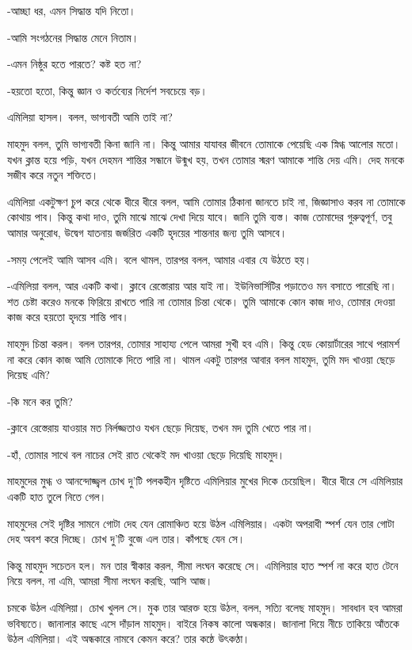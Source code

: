 \documentclass[
]{book}
\begin{document}
-আচ্ছা ধর, এমন সিদ্ধান্ত যদি নিতো।

-আমি সংগঠনের সিদ্ধান্ত মেনে নিতাম।

-এমন নিষ্ঠুর হতে পারতে? কষ্ট হত না?

-হয়তো হতো, কিন্তু জ্ঞান ও কর্তব্যের নির্দেশ সবচেয়ে বড়।

এমিলিয়া হাসল। বলল, ভাগ্যবতী আমি তাই না?

মাহমুদ বলল, তুমি ভাগ্যবতী কিনা জানি না। কিন্তু আমার যাযাবর জীবনে তোমাকে পেয়েছি এক স্নিগ্ধ আলোর মতো। যখন ক্লান্ত হয়ে পড়ি, যখন দেহমন শান্তির সন্ধানে উন্মুখ হয়, তখন তোমার স্মরণ আমাকে শান্তি দেয় এমি। দেহ মনকে সজীব করে নতুন শক্তিতে।

এমিলিয়া একটুক্ষণ চুপ করে থেকে ধীরে ধীরে বলল, আমি তোমার ঠিকানা জানতে চাই না, জিজ্ঞাসাও করব না তোমাকে কোথায় পাব। কিন্তু কথা দাও, তুমি মাঝে মাঝে দেখা দিয়ে যাবে। জানি তুমি ব্যস্ত। কাজ তোমাদের গুরুত্বপূর্ণ, তবু আমার অনুরোধ, উদ্বেগ যাতনায় জর্জরিত একটি হৃদয়ের শান্তনার জন্য তুমি আসবে।

-সময় পেলেই আমি আসব এমি। বলে থামল, তারপর বলল, আমার এবার যে উঠতে হয়।

-এমিলিয়া বলল, আর একটি কথা। ক্লাবে রেস্তোরায় আর যাই না। ইউনিভার্সিটির পড়াতেও মন বসাতে পারেছি না। শত চেষ্টা করেও মনকে ফিরিয়ে রাখতে পারি না তোমার চিন্তা থেকে। তুমি আমাকে কোন কাজ দাও, তোমার দেওয়া কাজ করে হয়তো হৃদয়ে শান্তি পাব।

মাহমুদ চিন্তা করল। বলল তারপর, তোমার সাহায্য পেলে আমরা সুখী হব এমি। কিন্তু হেড কোয়ার্টারের সাথে পরামর্শ না করে কোন কাজ আমি তোমাকে দিতে পারি না। থামল একটু তারপর আবার বলল মাহমুদ, তুমি মদ খাওয়া ছেড়ে দিয়েছ এমি?

-কি মনে কর তুমি?

-ক্লাবে রেস্তেরায় যাওয়ার মত নির্লজ্জতাও যখন ছেড়ে দিয়েছ, তখন মদ তুমি খেতে পার না।

-হাঁ, তোমার সাথে বল নাচের সেই রাত থেকেই মদ খাওয়া ছেড়ে দিয়েছি মাহমুদ।

মাহমুদের মুগ্ধ ও আনন্দোজ্জ্বল চোখ দু'টি পলকহীন দৃষ্টিতে এমিলিয়ার মুখের দিকে চেয়েছিল। ধীরে ধীরে সে এমিলিয়ার একটি হাত তুলে নিতে গেল।

মাহমুদের সেই দৃষ্টির সামনে গোটা দেহ যেন রোমাঞ্চিত হয়ে উঠল এমিলিয়ার। একটা অপরাধী স্পর্শ যেন তার গোটা দেহ অবশ করে দিচ্ছে। চোখ দু'টি বুজে এল তার। কাঁপছে যেন সে।

কিন্তু মাহমুদ সচেতন হল। মন তার স্বীকার করল, সীমা লংঘন করেছে সে। এমিলিয়ার হাত স্পর্শ না করে হাত টেনে নিয়ে বলল, না এমি, আমরা সীমা লংঘন করছি, আসি আজ।

চমকে উঠল এমিলিয়া। চোখ খুলল সে। মুক তার আরক্ত হয়ে উঠল, বলল, সত্যি বলেছ মাহমুদ। সাবধান হব আমরা ভবিষ্যতে। জানালার কাছে এসে দাঁড়াল মাহমুদ। বাইরে নিকষ কালো অন্ধকার। জানালা দিয়ে নীচে তাকিয়ে আঁতকে উঠল এমিলিয়া। এই অন্ধকারে নামবে কেমন করে? তার কন্ঠে উৎকণ্ঠা।
\end{document}
